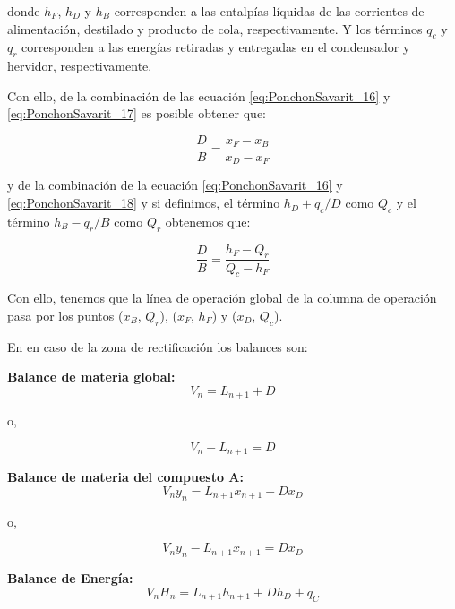 \documentclass[11pt]{book}
\begin{document}
donde $h_F$, $h_D$ y $h_B$ corresponden a las entalpías líquidas de las corrientes de alimentación, destilado y producto de cola, respectivamente. Y los términos $q_c$ y $q_r$ corresponden a las energías retiradas y entregadas en el condensador y hervidor, respectivamente. 

Con ello, de la combinación de las ecuación \ref{eq:PonchonSavarit_16} y \ref{eq:PonchonSavarit_17} es posible obtener que:

\begin{equation}
    \label{eq:PonchonSavarit_19}
    \frac{D}{B} = \frac{x_F - x_B}{x_D - x_F}
\end{equation}

y de la combinación de la ecuación \ref{eq:PonchonSavarit_16} y \ref{eq:PonchonSavarit_18} y si definimos, el término $h_D + q_c/D$ como $Q_c$ y el término $h_B - q_r/B$ como $Q_r$  obtenemos que:

\begin{equation}
    \label{eq:PonchonSavarit_20}
    \frac{D}{B} = \frac{h_F - Q_r}{Q_c - h_F}
\end{equation}

Con ello, tenemos que la línea de operación global de la columna de operación pasa por los puntos ($x_B$, $Q_r$), ($x_F$, $h_F$) y ($x_D$, $Q_c$).

En en caso de la zona de rectificación los balances son:

\textbf{Balance de materia global:}
\begin{equation*}
    V_n = L_{n+1} + D
\end{equation*}

o, 

\begin{equation}
    \label{eq:PonchonSavarit_1}
    V_n - L_{n+1} = D
\end{equation}


\textbf{Balance de materia del compuesto A:}
\begin{equation*}
    V_n  y_n= L_{n+1} x_{n+1} + D x_D
\end{equation*}

o, 

\begin{equation*}
    \label{eq:PonchonSavarit_2}
    V_n  y_n - L_{n+1} x_{n+1} = D x_D
\end{equation*}

\textbf{Balance de Energía:}
\begin{equation*}
    V_n  H_n= L_{n+1} h_{n+1} + D h_D + q_C
\end{equation*}
\end{document}
